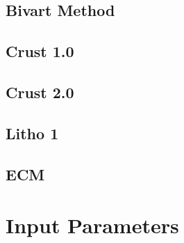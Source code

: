 		\section{Bivart Method}
		\label{Geology: Bivart Method}
		\section{Crust 1.0}
		\section{Crust 2.0}
		\section{Litho 1}
		\section{ECM}
		
	\chapter{Input Parameters}
